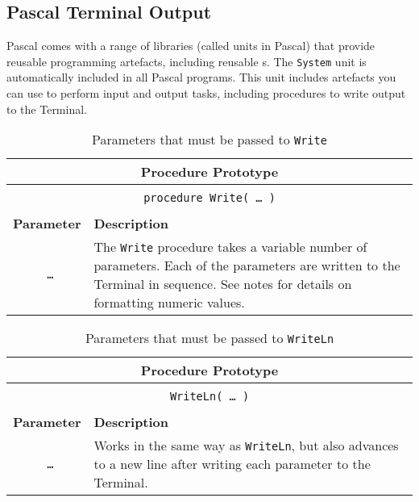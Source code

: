 \clearpage
\subsection{Pascal Terminal Output} %
\label{sub:pas_console_output}

Pascal comes with a range of libraries (called units in Pascal) that provide reusable programming artefacts, including reusable s. The \texttt{System} unit is automatically included in all Pascal programs. This unit includes artefacts you can use to perform input and output tasks, including procedures to write output to the Terminal.

\begin{table}[h]
  \centering
  \begin{tabular}{|c|p{9cm}|}
    \hline
    \multicolumn{2}{|c|}{\textbf{Procedure Prototype}} \\
    \hline
    \multicolumn{2}{|c|}{} \\
    \multicolumn{2}{|c|}{\texttt{procedure Write( {\ldots} )}} \\
    \multicolumn{2}{|c|}{} \\
    \hline
    \textbf{Parameter} & \textbf{Description} \\
    \hline
    \texttt{ \ldots } & The \texttt{Write} procedure takes a variable number of parameters. Each of the parameters are written to the Terminal in sequence. See notes for details on formatting numeric values. \\
    \hline
  \end{tabular}
  \caption{Parameters that must be passed to \texttt{Write}}
  \label{tbl:program-creation-pas write parameters}
\end{table}

\begin{table}[h]
  \centering
  \begin{tabular}{|c|p{9cm}|}
    \hline
    \multicolumn{2}{|c|}{\textbf{Procedure Prototype}} \\
    \hline
    \multicolumn{2}{|c|}{} \\
    \multicolumn{2}{|c|}{\texttt{WriteLn( {\ldots} )}} \\
    \multicolumn{2}{|c|}{} \\
    \hline
    \textbf{Parameter} & \textbf{Description} \\
    \hline
    \texttt{ \ldots } & Works in the same way as \texttt{WriteLn}, but also advances to a new line after writing each parameter to the Terminal. \\
    \hline
  \end{tabular}
  \caption{Parameters that must be passed to \texttt{WriteLn}}
  \label{tbl:program-creation-pas writeln parameters}
\end{table}


